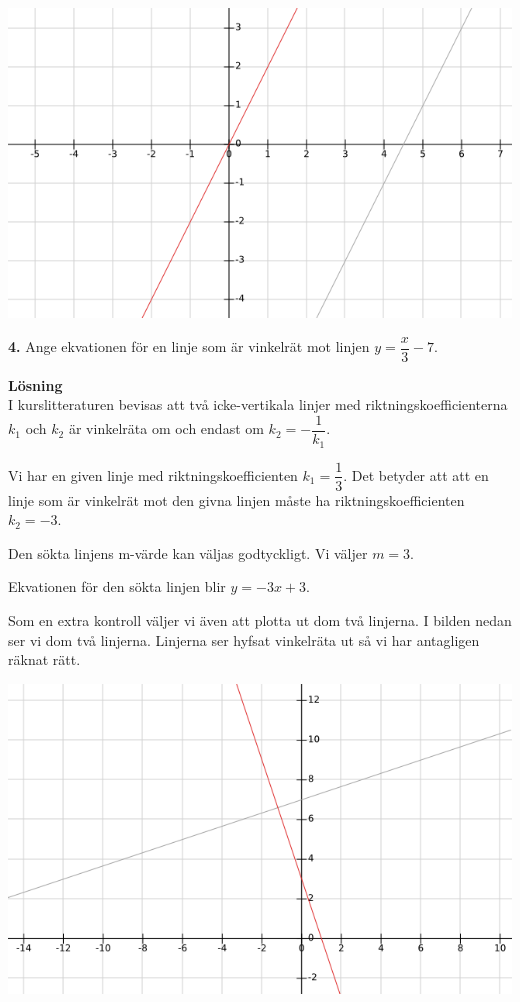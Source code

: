 \documentclass{article}
\begin{document}
\includegraphics[scale=0.65]{graph_1_3_1.png} 

\textbf{4.} Ange ekvationen för en linje som är vinkelrät mot linjen $y=\dfrac{x}{3}-7$.

\textbf{Lösning}\\
I kurslitteraturen bevisas att två icke-vertikala linjer med riktningskoefficienterna $k_{1}$ och $k_{2}$ är vinkelräta om och endast om $k_{2} = -\dfrac{1}{k_{1}}$.

Vi har en given linje med riktningskoefficienten $k_{1} = \dfrac{1}{3}$. Det betyder att att en linje som är vinkelrät mot den givna linjen måste ha  riktningskoefficienten $k_{2}=-3$.

Den sökta linjens m-värde kan väljas godtyckligt. Vi väljer $m = 3$.

Ekvationen för den sökta linjen blir $y = -3x + 3$.

Som en extra kontroll väljer vi även att plotta ut dom två linjerna. I bilden nedan ser vi dom två linjerna. Linjerna ser hyfsat vinkelräta ut så vi har antagligen räknat rätt.

\includegraphics[scale=0.65]{graph_1_4_1.png}
\end{document}
